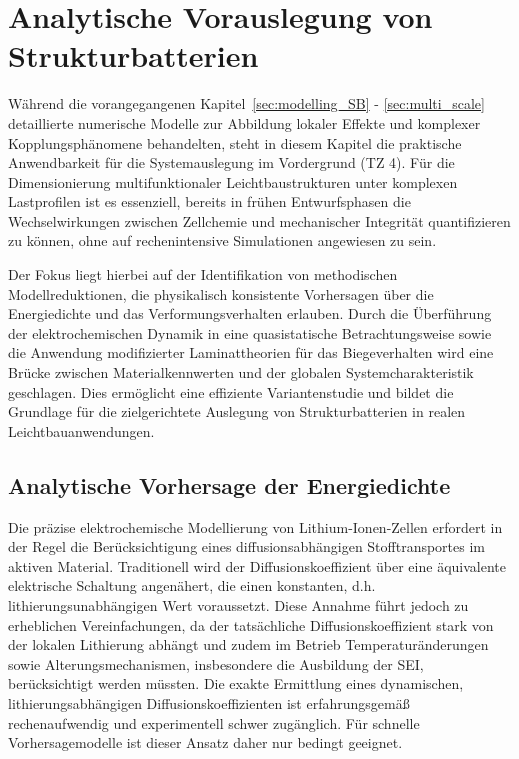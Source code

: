 \chapter{Analytische Vorauslegung von Strukturbatterien}\label{sec:analytical_approach}
Während die vorangegangenen Kapitel~\ref{sec:modelling_SB} - \ref{sec:multi_scale} detaillierte numerische Modelle zur Abbildung lokaler Effekte und komplexer Kopplungsphänomene behandelten, steht in diesem Kapitel die praktische Anwendbarkeit für die Systemauslegung im Vordergrund (TZ 4). Für die Dimensionierung multifunktionaler Leichtbaustrukturen unter komplexen Lastprofilen ist es essenziell, bereits in frühen Entwurfsphasen die Wechselwirkungen zwischen Zellchemie und mechanischer Integrität quantifizieren zu können, ohne auf rechenintensive Simulationen angewiesen zu sein.

Der Fokus liegt hierbei auf der Identifikation von methodischen Modellreduktionen, die physikalisch konsistente Vorhersagen über die Energiedichte und das Verformungsverhalten erlauben. Durch die Überführung der elektrochemischen Dynamik in eine quasistatische Betrachtungsweise sowie die Anwendung modifizierter Laminattheorien für das Biegeverhalten wird eine Brücke zwischen Materialkennwerten und der globalen Systemcharakteristik geschlagen. Dies ermöglicht eine effiziente Variantenstudie und bildet die Grundlage für die zielgerichtete Auslegung von Strukturbatterien in realen Leichtbauanwendungen.

\section{Analytische Vorhersage der Energiedichte}\label{sec:improve_elchem}
Die präzise elektrochemische Modellierung von Lithium-Ionen-Zellen erfordert in der Regel die Berücksichtigung eines diffusionsabhängigen Stofftransportes im aktiven Material. Traditionell wird der Diffusionskoeffizient über eine äquivalente elektrische Schaltung angenähert, die einen konstanten, d.h. lithierungsunabhängigen Wert voraussetzt. Diese Annahme führt jedoch zu erheblichen Vereinfachungen, da der tatsächliche Diffusionskoeffizient stark von der lokalen Lithierung abhängt und zudem im Betrieb Temperaturänderungen sowie Alterungsmechanismen, insbesondere die Ausbildung der SEI, berücksichtigt werden müssten. Die exakte Ermittlung eines dynamischen, lithierungsabhängigen Diffusionskoeffizienten ist erfahrungsgemäß rechenaufwendig und experimentell schwer zugänglich. Für schnelle Vorhersagemodelle ist dieser Ansatz daher nur bedingt geeignet.

